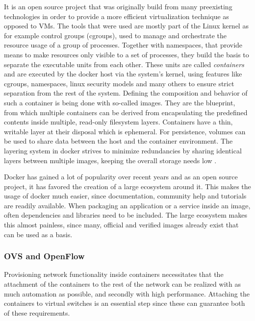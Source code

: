 It is an open source project that was originally build from many preexisting technologies in order to provide a more efficient virtualization technique as opposed to VMs. The tools that were used are mostly part of the Linux kernel as for example control groups (cgroups), used to manage and orchestrate the resource usage of a group of processes. Together with namespaces, that provide means to make resources only visible to a set of processes, they build the basis to separate the executable units from each other. These units are called \textit{containers} and are executed by the docker host via the system's kernel, using features like cgroups, namespaces, linux security models and many others to ensure strict separation from the rest of the system. Defining the composition and behavior of such a container is being done with so-called images. They are the blueprint, from which multiple containers can be derived from encapsulating the predefined contents inside multiple, read-only filesystem layers. Containers have a thin, writable layer at their disposal which is ephemeral. For persistence, volumes can be used to share data between the host and the container environment. The layering system in docker strives to minimize redundancies by sharing identical layers between multiple images, keeping the overall storage needs low \cite{fink2014docker} \cite{morabito2015hypervisors}.

Docker has gained a lot of popularity over recent years and as an open source project, it has favored the creation of a large ecosystem around it. This makes the usage of docker much easier, since documentation, community help and tutorials are readily available. When packaging an application or a service inside an image, often dependencies and libraries need to be included. The large ecosystem makes this almost painless, since many, official and verified images already exist that can be used as a basis.

\subsubsection{OVS and OpenFlow}
Provisioning network functionality inside containers necessitates that the attachment of the containers to the rest of the network can be realized with as much automation as possible, and secondly with high performance. Attaching the containers to virtual switches is an essential step since these can guarantee both of these requirements. 

